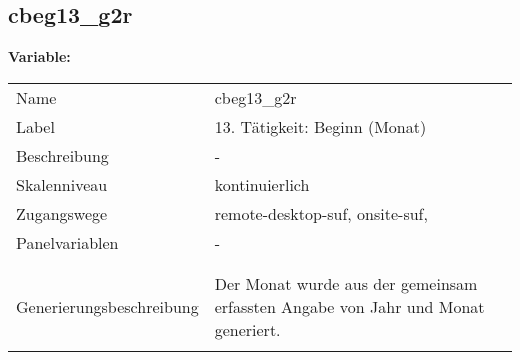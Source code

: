 	
	
	\subsection{cbeg13\_g2r}
	\label{subSection:cbeg13_g2r}

	\noindent\textbf{Variable:}\\
		\begin{tabular}{lL{11.3cm}}
			\label{tableVariable:cbeg13_g2r}
			Name & cbeg13\_g2r \\
			Label & 13. Tätigkeit: Beginn (Monat)  \\
			Beschreibung & - \\
			Skalenniveau & kontinuierlich \\
			Zugangswege &
				remote-desktop-suf,
				onsite-suf,
 \\
			Panelvariablen & -
			 \\
			 \\
 \\
					Generierungsbeschreibung & Der Monat wurde aus der gemeinsam erfassten Angabe von Jahr und Monat generiert. 
				 \\	
			 \\
		\end{tabular}





